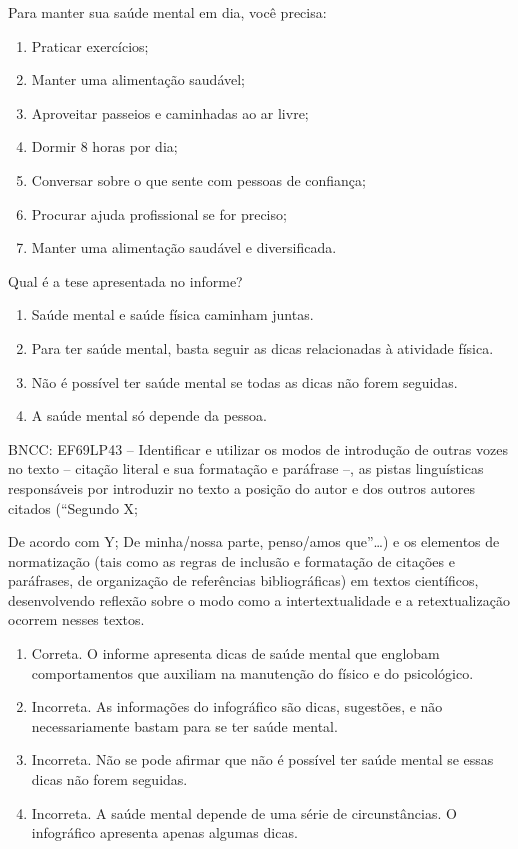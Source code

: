 Para manter sua saúde mental em dia, você precisa: 

\begin{enumerate}
\def\labelenumi{\alph{enumi})}
\item Praticar exercícios; 
\item Manter uma alimentação saudável; 
\item Aproveitar passeios e caminhadas ao ar livre;
\item Dormir 8 horas por dia; 
\item Conversar sobre o que sente com pessoas de confiança; 
\item Procurar ajuda profissional se for preciso; 
\item Manter uma alimentação saudável e diversificada.
\end{enumerate}

Qual é a tese apresentada no informe?

\begin{enumerate}
\def\labelenumi{\alph{enumi})}
\item Saúde mental e saúde física caminham juntas.
\item Para ter saúde mental, basta seguir as dicas relacionadas à atividade física.
\item Não é possível ter saúde mental se todas as dicas não forem seguidas.
\item A saúde mental só depende da pessoa.
\end{enumerate}

BNCC: EF69LP43 -- Identificar e utilizar os modos de introdução de
outras vozes no texto -- citação literal e sua formatação e paráfrase
--, as pistas linguísticas responsáveis por introduzir no texto a
posição do autor e dos outros autores citados (``Segundo X; 

De acordo com Y; De minha/nossa parte, penso/amos que''\ldots) e os elementos de
normatização (tais como as regras de inclusão e formatação de citações e
paráfrases, de organização de referências bibliográficas) em textos
científicos, desenvolvendo reflexão sobre o modo como a
intertextualidade e a retextualização ocorrem nesses textos.

\begin{enumerate}
\def\labelenumi{\alph{enumi})}
\item Correta. O informe apresenta dicas de saúde mental que englobam
comportamentos que auxiliam na manutenção do físico e do psicológico.
\item Incorreta. As informações do infográfico são dicas, sugestões, e não
necessariamente bastam para se ter saúde mental.
\item Incorreta. Não se pode afirmar que não é possível ter saúde mental se
essas dicas não forem seguidas.
\item Incorreta. A saúde mental depende de uma série de circunstâncias. O
infográfico apresenta apenas algumas dicas.
\end{enumerate}


